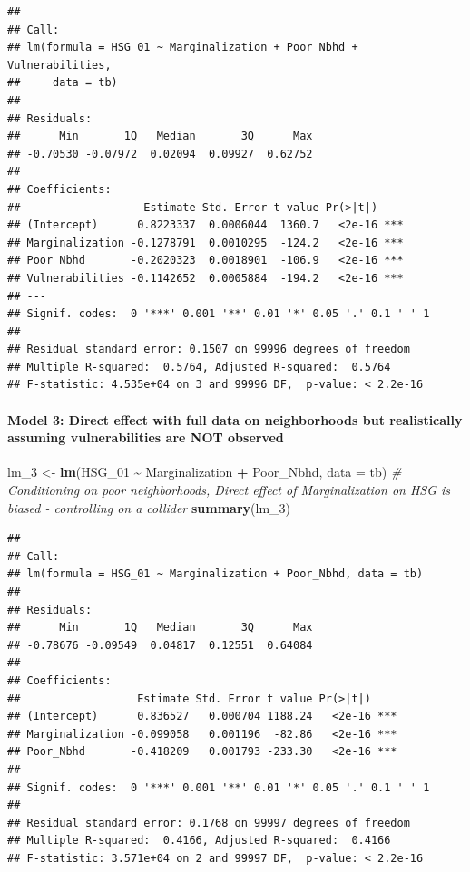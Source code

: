\documentclass[
]{article}
\newenvironment{Shaded}{\begin{snugshade}}{\end{snugshade}}
\newcommand{\AttributeTok}[1]{\textcolor[rgb]{0.13,0.29,0.53}{#1}}
\newcommand{\CommentTok}[1]{\textcolor[rgb]{0.56,0.35,0.01}{\textit{#1}}}
\newcommand{\FunctionTok}[1]{\textcolor[rgb]{0.13,0.29,0.53}{\textbf{#1}}}
\newcommand{\NormalTok}[1]{#1}
\newcommand{\OtherTok}[1]{\textcolor[rgb]{0.56,0.35,0.01}{#1}}
\newcommand{\SpecialCharTok}[1]{\textcolor[rgb]{0.81,0.36,0.00}{\textbf{#1}}}
\begin{document}
\begin{verbatim}
## 
## Call:
## lm(formula = HSG_01 ~ Marginalization + Poor_Nbhd + Vulnerabilities, 
##     data = tb)
## 
## Residuals:
##      Min       1Q   Median       3Q      Max 
## -0.70530 -0.07972  0.02094  0.09927  0.62752 
## 
## Coefficients:
##                   Estimate Std. Error t value Pr(>|t|)    
## (Intercept)      0.8223337  0.0006044  1360.7   <2e-16 ***
## Marginalization -0.1278791  0.0010295  -124.2   <2e-16 ***
## Poor_Nbhd       -0.2020323  0.0018901  -106.9   <2e-16 ***
## Vulnerabilities -0.1142652  0.0005884  -194.2   <2e-16 ***
## ---
## Signif. codes:  0 '***' 0.001 '**' 0.01 '*' 0.05 '.' 0.1 ' ' 1
## 
## Residual standard error: 0.1507 on 99996 degrees of freedom
## Multiple R-squared:  0.5764, Adjusted R-squared:  0.5764 
## F-statistic: 4.535e+04 on 3 and 99996 DF,  p-value: < 2.2e-16
\end{verbatim}

\paragraph{Model 3: Direct effect with full data on neighborhoods but
realistically assuming vulnerabilities are NOT
observed}\label{model-3-direct-effect-with-full-data-on-neighborhoods-but-realistically-assuming-vulnerabilities-are-not-observed}

\begin{Shaded}
\begin{Highlighting}[]
\NormalTok{lm\_3 }\OtherTok{\textless{}{-}} \FunctionTok{lm}\NormalTok{(HSG\_01 }\SpecialCharTok{\textasciitilde{}}\NormalTok{ Marginalization }\SpecialCharTok{+}\NormalTok{ Poor\_Nbhd, }\AttributeTok{data =}\NormalTok{ tb) }\CommentTok{\# Conditioning on poor neighborhoods, Direct effect of Marginalization on HSG is biased {-} controlling on a collider}
\FunctionTok{summary}\NormalTok{(lm\_3)}
\end{Highlighting}
\end{Shaded}

\begin{verbatim}
## 
## Call:
## lm(formula = HSG_01 ~ Marginalization + Poor_Nbhd, data = tb)
## 
## Residuals:
##      Min       1Q   Median       3Q      Max 
## -0.78676 -0.09549  0.04817  0.12551  0.64084 
## 
## Coefficients:
##                  Estimate Std. Error t value Pr(>|t|)    
## (Intercept)      0.836527   0.000704 1188.24   <2e-16 ***
## Marginalization -0.099058   0.001196  -82.86   <2e-16 ***
## Poor_Nbhd       -0.418209   0.001793 -233.30   <2e-16 ***
## ---
## Signif. codes:  0 '***' 0.001 '**' 0.01 '*' 0.05 '.' 0.1 ' ' 1
## 
## Residual standard error: 0.1768 on 99997 degrees of freedom
## Multiple R-squared:  0.4166, Adjusted R-squared:  0.4166 
## F-statistic: 3.571e+04 on 2 and 99997 DF,  p-value: < 2.2e-16
\end{verbatim}
\end{document}
